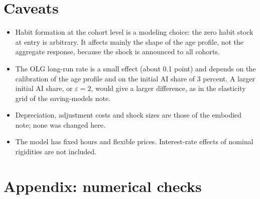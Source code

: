 \documentclass[11pt]{article}
\begin{document}
\section{Caveats}
\begin{itemize}
\item Habit formation at the cohort level is a modeling choice: the zero habit stock at entry is arbitrary. It affects mainly the shape of the age profile, not the aggregate response, because the shock is announced to all cohorts.
\item The OLG long-run rate is a small effect (about 0.1 point) and depends on the calibration of the age profile and on the initial AI share of 3 percent. A larger initial AI share, or $\varepsilon=2$, would give a larger difference, as in the elasticity grid of the saving-models note.
\item Depreciation, adjustment costs and shock sizes are those of the embodied note; none was changed here.
\item The model has fixed hours and flexible prices. Interest-rate effects of nominal rigidities are not included.
\end{itemize}

\section*{Appendix: numerical checks}
\begin{table}[h!]
\centering\small

\end{table}
\end{document}
